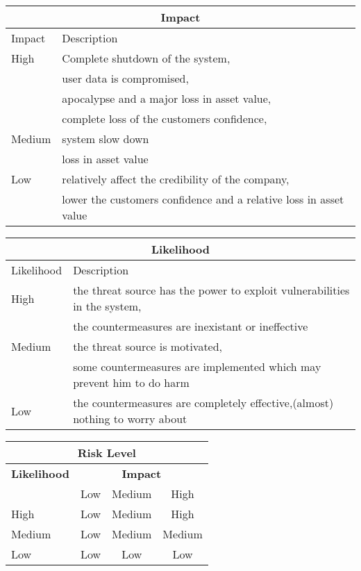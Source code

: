 \begin{center}
\begin{tabular}{|l|l|}
\hline
\multicolumn{2}{|c|}{\bf Impact} \\
\hline
Impact & Description \\
\hline
\hline
High & Complete shutdown of the system, \\
     & user data is compromised, \\
     & apocalypse and a major loss in asset value,\\
     & complete loss of the customers confidence, \\
     
\hline
Medium & system slow down\\
	   & loss in asset value \\
\hline
Low   & relatively affect the credibility of the company,\\
& lower the customers confidence and a relative loss in asset value\\
\hline
\end{tabular}
%
%
\begin{tabular}{|l|l|}
\hline
\multicolumn{2}{|c|}{\bf Likelihood} \\
\hline
Likelihood & Description \\
\hline
\hline
High   &  the threat source has the power to exploit vulnerabilities in the system,\\
& the countermeasures are inexistant or ineffective \\
\hline
Medium & the threat source is motivated, \\
& some countermeasures are implemented which may prevent him to do harm \\
\hline
Low   & the countermeasures are completely effective,(almost) nothing to worry about \\
\hline
\end{tabular}
\end{center}

\vspace{5mm}

\begin{center}
\begin{tabular}{|l|c|c|c|}
\hline
\multicolumn{4}{|c|}{{\bf Risk Level}} \\
\hline
{{\bf Likelihood}} & \multicolumn{3}{c|}{{\bf Impact}} \\ %
     & Low & Medium & High \\  \hline
 High & Low & Medium & High  \\
\hline
 Medium & Low & Medium & Medium \\
\hline
 Low & Low & Low & Low \\
\hline
\end{tabular}
\end{center}

